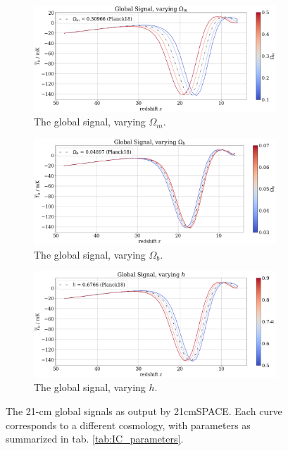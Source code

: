 \documentclass[floats,floatfix,showpacs,amssymb,prd,superscriptaddress,nofootinbib]{revtex4-2} %
\begin{document}
\begin{figure}[H]
     \centering
     \begin{subfigure}[b]{0.9\textwidth}
         \centering
         \includegraphics[width=\textwidth]{images/simulation_results/global_signal_Om.png}
         \caption{The global signal, varying $\Omega_m$.}
         \label{fig:global_signal_Om}
     \end{subfigure}
     \hfill
     \begin{subfigure}[b]{0.9\textwidth}
         \centering
         \includegraphics[width=\textwidth]{images/simulation_results/global_signal_Ob.png}
         \caption{The global signal, varying $\Omega_b$.}
         \label{fig:global_signal_Ob}
     \end{subfigure}
     \hfill
     \begin{subfigure}[b]{0.9\textwidth}
         \centering
         \includegraphics[width=\textwidth]{images/simulation_results/global_signal_h.png}
         \caption{The global signal, varying $h$.}
         \label{fig:global_signal_h}
     \end{subfigure}
        \caption{The 21-cm global signals as output by 21cmSPACE. Each curve corresponds to a different cosmology, with parameters as summarized in tab. \ref{tab:IC_parameters}.}
        \label{fig:global_signal_all}
\end{figure}
\end{document}
